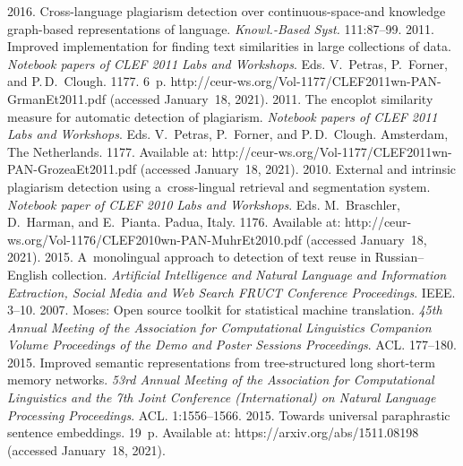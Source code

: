 \begin{multicols}{2}
{{\begin{thebibliography}{99}
 2016. Cross-language plagiarism detection over continuous-space-and knowledge graph-based 
 representations of language. \textit{Knowl.-Based Syst.} 111:87--99.
 2011. Improved implementation for finding text similarities in large collections of data.
 \textit{Notebook papers of CLEF 2011 Labs and Workshops}.  Eds. V.~Petras, P.~Forner, and P.\,D.~Clough. 1177. 6~p.
 {\sf http://ceur-ws.org/Vol-1177/CLEF2011wn-PAN-GrmanEt2011.pdf} (accessed January~18, 2021).
 2011. 
The encoplot similarity measure for automatic detection of plagiarism. 
\textit{Notebook papers of CLEF 2011 Labs and Workshops}.  Eds. V.~Petras, P.~Forner, and P.\,D.~Clough.
Amsterdam, The Netherlands. 1177. Available at: 
{\sf http://ceur-ws.org/\linebreak  Vol-1177/CLEF2011wn-PAN-GrozeaEt2011.pdf} (accessed January~18, 2021).
 2010. External and intrinsic plagiarism detection using 
 a~cross-lingual retrieval and segmentation system. 
 \textit{Notebook paper of CLEF 2010 Labs and Workshops}.
Eds. M.~Braschler, D.~Harman, and  E.~Pianta. Padua, Italy. 1176. 
 Available at: {\sf http://ceur-ws.org/Vol-1176/CLEF2010wn-PAN-MuhrEt2010.pdf} (accessed January~18, 2021).
 2015. A~monolingual approach to detection of text reuse in Russian--English collection. 
 \textit{Artificial Intelligence and Natural Language and Information Extraction, 
 Social Media and Web Search FRUCT Conference Proceedings}. IEEE. 3--10.
 2007. Moses: 
Open source toolkit for statistical machine translation. 
\textit{45th Annual Meeting of the Association for Computational Linguistics 
Companion Volume Proceedings of the Demo and Poster Sessions Proceedings}. ACL. 177--180.
 2015. Improved semantic representations from tree-structured long short-term memory networks. 
 \textit{53rd Annual Meeting of the Association for Computational Linguistics and the 
 7th  Joint Conference (International) on Natural Language Processing Proceedings}. ACL. 1:1556--1566.
 2015.
 Towards universal paraphrastic sentence embeddings. 19~p. 
 Available at: {\sf https://arxiv.org/abs/1511.08198} (accessed January~18, 2021).

\end{thebibliography}}}
\end{multicols}
